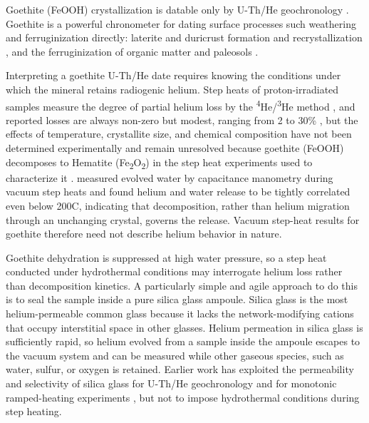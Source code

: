 Goethite (FeOOH) crystallization is datable only by U-Th/He geochronology \citep{shustervasconcelos2005,farley2024}. Goethite is a powerful chronometer for dating surface processes such weathering and ferruginization directly: laterite and duricrust formation and recrystallization \citep{monteiro2014,allard2018}, and the ferruginization of organic matter and paleosols \citep{heim2006,yappshuster2011,vasconcelos2013,danisik2013,hofmann2017}. 

Interpreting a goethite U-Th/He date requires knowing the conditions under which the mineral retains radiogenic helium. Step heats of proton-irradiated samples measure the degree of partial helium loss by the \textsuperscript{4}He/\textsuperscript{3}He method \citep{shustervasconcelos2005}, and reported losses are always non-zero but modest, ranging from 2 to 30\% \citep{shustervasconcelos2005,heim2006,hofmann2017,deng2017}, but the effects of temperature, crystallite size, and chemical composition have not been determined experimentally and remain unresolved because goethite (FeOOH) decomposes to Hematite (Fe\textsubscript{2}O\textsubscript{2}) in the step heat experiments used to characterize it \citep{farley2024}. \citet{farley2024} measured evolved water by capacitance manometry during vacuum step heats and found helium and water release to be tightly correlated even below 200\textdegree C, indicating that decomposition, rather than helium migration through an unchanging crystal, governs the release. Vacuum step-heat results for goethite therefore need not describe helium behavior in nature.

Goethite dehydration is suppressed at high water pressure, so a step heat conducted under hydrothermal conditions may interrogate helium loss rather than decomposition kinetics. 
A particularly simple and agile approach to do this is to seal the sample inside a pure silica glass ampoule. Silica glass is the most helium-permeable common glass \citep{norton1953,altemose1961} because it lacks the network-modifying cations that occupy interstitial space in other glasses. Helium permeation in silica glass is sufficiently rapid, so helium evolved from a sample inside the ampoule escapes to the vacuum system and can be measured while other gaseous species, such as water, sulfur, or oxygen is retained. Earlier work has exploited the permeability and selectivity of silica glass for U-Th/He geochronology \citep{yakubovich2020,yakubovich2021,yakubovich2024} and for monotonic ramped-heating experiments \citep{yakubovich2019}, but not to impose hydrothermal conditions during step heating. 

